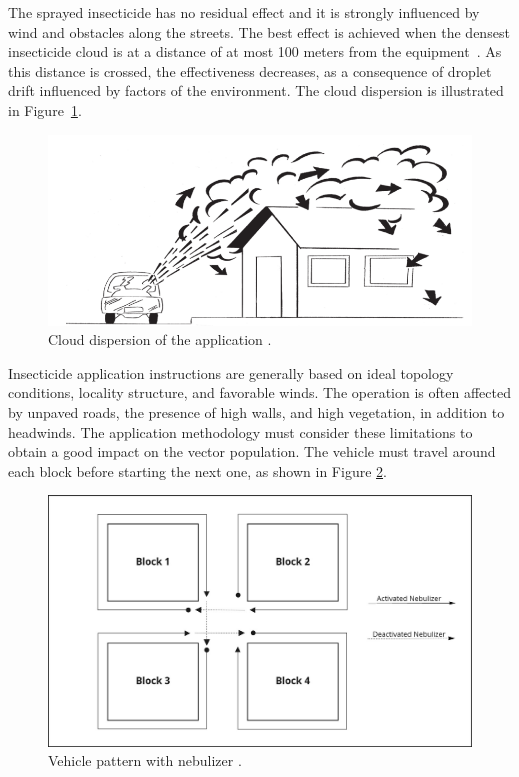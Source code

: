 The sprayed insecticide has no residual  effect and it is strongly influenced by wind  and obstacles  along the  streets. The  best effect  is achieved  when the densest  insecticide cloud  is at  a distance  of at  most 100  meters from  the equipment~\citep{brasil-dept-helth:2009}.  As this  distance  is  crossed, the  effectiveness  decreases, as a consequence of droplet drift influenced by factors of the environment. The cloud dispersion is illustrated in Figure~\ref{fig:dispersion}.

\begin{figure}[!ht]
  \centering
  \includegraphics[scale=0.4]{images/cloud-dispersion.png}
  \caption{Cloud dispersion of the application \citep{brasil-dept-helth:2009}.}
  \label{fig:dispersion}
\end{figure}

Insecticide application instructions are generally based on ideal topology conditions, locality structure, and favorable
winds. The operation is often affected by unpaved roads, the presence of high
walls,  and  high   vegetation,  in  addition  to   headwinds.  The application methodology must consider these limitations to obtain a good impact on the
vector population. The vehicle must travel around each block before starting the
next one, as shown in Figure \ref{fig:travel-pattern}.

\begin{figure}[!ht]
  \centering
  \includegraphics[scale=0.25]{images/visit-pattern.jpg}
  \caption{Vehicle pattern with nebulizer \cite{brasil-dept-helth:2009}.}
  \label{fig:travel-pattern}
\end{figure}

